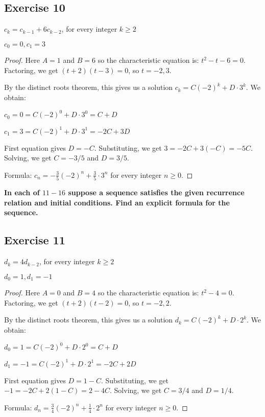 \documentclass[14pt]{extarticle}
\newcommand{\cy}{\color{cyan}}
\begin{document}
\subsection{Exercise 10}
\(c_k = c_{k-1} + 6c_{k-2}\), for every integer \(k \geq 2\)

\(c_0 = 0, c_1 = 3\)

\begin{proof}
    Here $A = 1$ and $B = 6$ so the characteristic equation is: \(t^2 - t - 6 = 0\).
    Factoring, we get \((t + 2)(t - 3) = 0\), so $t = -2, 3$.

    By the distinct roots theorem, this gives us a solution \(c_k = C(-2)^k + D \cdot 3^k\). We obtain:

    \(c_0 = 0 = C(-2)^0 + D \cdot 3^0 = C + D\)

    \(c_1 = 3 = C(-2)^1 + D \cdot 3^1 = -2C + 3D\)

    First equation gives $D = - C$. Substituting, we get \(3 = -2C + 3(- C) = - 5C\). Solving, we get $C = -3/5$ and $D = 3/5$.

    Formula: \(c_n = -\frac{3}{5}(-2)^n + \frac{3}{5} \cdot 3^n\) for every integer \(n \geq 0\).
\end{proof}

{\bf \cy In each of $11-16$ suppose a sequence satisfies the given recurrence relation and initial conditions. Find an explicit formula for the sequence.}

\subsection{Exercise 11}
\(d_k = 4d_{k-2}\), for every integer \(k \geq 2\)

\(d_0 = 1, d_1 = -1\)

\begin{proof}
    Here $A = 0$ and $B = 4$ so the characteristic equation is: \(t^2 - 4 = 0\).
    Factoring, we get \((t + 2)(t - 2) = 0\), so $t = -2, 2$.

    By the distinct roots theorem, this gives us a solution \(d_k = C(-2)^k + D \cdot 2^k\). We obtain:

    \(d_0 = 1 = C(-2)^0 + D \cdot 2^0 = C + D\)

    \(d_1 = -1 = C(-2)^1 + D \cdot 2^1 = -2C + 2D\)

    First equation gives $D = 1 - C$. Substituting, we get \(-1 = -2C + 2(1 - C) = 2 - 4C\). Solving, we get $C = 3/4$ and $D = 1/4$.

    Formula: \(d_n = \frac{3}{4}(-2)^n + \frac{1}{4} \cdot 2^n\) for every integer \(n \geq 0\).
\end{proof}
\end{document}
